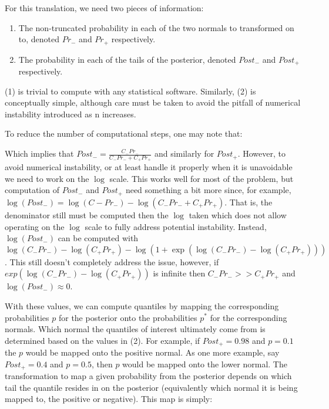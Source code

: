 For this translation, we need two pieces of information:

\begin{enumerate}
\item The non-truncated probability in each of the two normals to transformed on to, denoted $Pr_{-}$ and $Pr_{+}$ respectively.
\item The probability in each of the tails of the posterior, denoted $Post_{-}$ and $Post_{+}$ respectively.
\end{enumerate}

(1) is trivial to compute with any statistical software. Similarly, (2) is conceptually simple, although care must be taken to avoid the pitfall of numerical instability introduced as n increases.

To reduce the number of computational steps, one may note that:


Which implies that $Post_- = \frac{C_{-} Pr_{-}}{C_{-} Pr_{-} + C_{+} Pr_{+}}$ and similarly for $Post_+$. However, to avoid numerical instability, or at least handle it properly when it is unavoidable we need to work on the $\log$ scale. This works well for most of the problem, but computation of $Post_-$ and $Post_+$ need something a bit more since, for example, $\log(Post_-) = \log(C{-}Pr_{-}) - \log(C_{-} Pr_{-} + C_{+} Pr_{+})$. That is, the denominator still must be computed then the $\log$ taken which does not allow operating on the $\log$ scale to fully address potential instability. Instead, $\log(Post_-)$ can be computed with $\log(C_-Pr_-) -  \log(C_+Pr_+) - \log(1 + \exp(\log(C_-Pr_-) -  \log(C_+Pr_+)))$. This still doesn't completely address the issue, however, if $exp(\log(C_-Pr_-) -  \log(C_+Pr_+))$ is infinite then $C_-Pr_- >> C_+Pr_+$ and $\log(Post_-) \approx 0$.

With these values, we can compute quantiles by mapping the corresponding probabilities $p$ for the posterior onto the probabilities $p^*$ for the corresponding normals. Which normal the quantiles of interest ultimately come from is determined based on the values in (2). For example, if $Post_{+} = 0.98$ and $p = 0.1$ the $p$ would be mapped onto the positive normal. As one more example, say $Post_{+} = 0.4$ and $p = 0.5$, then $p$ would be mapped onto the lower normal. The transformation to map a given probability from the posterior depends on which tail the quantile resides in on the posterior (equivalently which normal it is being mapped to, the positive or negative). This map is simply:

